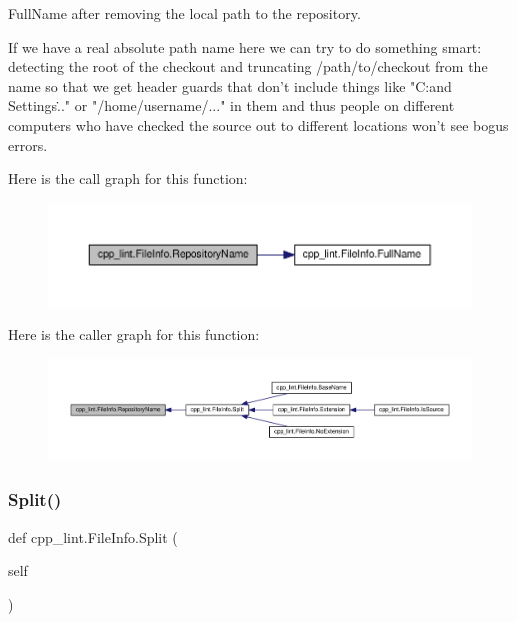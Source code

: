 \begin{DoxyVerb}FullName after removing the local path to the repository.

If we have a real absolute path name here we can try to do something smart:
detecting the root of the checkout and truncating /path/to/checkout from
the name so that we get header guards that don't include things like
"C:\Documents and Settings\..." or "/home/username/..." in them and thus
people on different computers who have checked the source out to different
locations won't see bogus errors.
\end{DoxyVerb}
 Here is the call graph for this function\+:
\nopagebreak
\begin{figure}[H]
\begin{center}
\leavevmode
\includegraphics[width=350pt]{classcpp__lint_1_1_file_info_a62630bdb99c90fa78ea093c9a8512bb4_cgraph}
\end{center}
\end{figure}
Here is the caller graph for this function\+:
\nopagebreak
\begin{figure}[H]
\begin{center}
\leavevmode
\includegraphics[width=350pt]{classcpp__lint_1_1_file_info_a62630bdb99c90fa78ea093c9a8512bb4_icgraph}
\end{center}
\end{figure}
\mbox{\label{classcpp__lint_1_1_file_info_a0bcdc189921dccc91e7bd9ffad0d57de}} 
\subsubsection{\texorpdfstring{Split()}{Split()}}
{\footnotesize\ttfamily def cpp\+\_\+lint.\+File\+Info.\+Split (\begin{DoxyParamCaption}\item[{}]{self }\end{DoxyParamCaption})}


